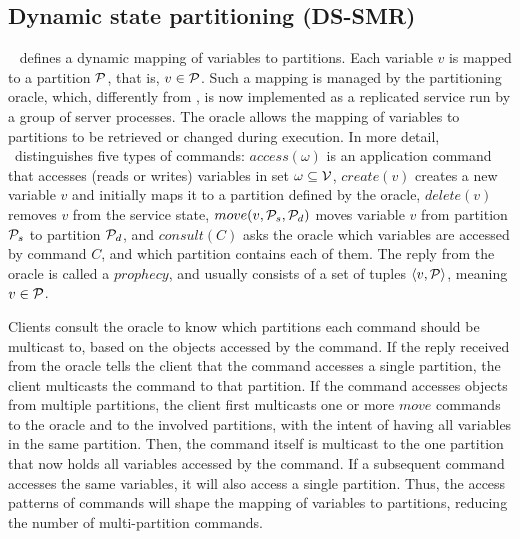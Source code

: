 \subsection{Dynamic state partitioning (DS-SMR)}

\dssmr{}~\cite{hoang2016} defines a dynamic mapping of variables to partitions.
Each variable $v$ is mapped to a partition $\mathcal{P}$, that is, $v \in \mathcal{P}$.
Such a mapping is managed by the partitioning oracle, which, differently from \ssmr, is now implemented as a replicated service run by a group of server processes.
The oracle allows the mapping of variables to partitions to be retrieved or changed during execution.
In more detail, \dssmr\ distinguishes five types of commands:
$access(\omega)$ is an application command that accesses (reads or writes) variables in set $\omega \subseteq \mathcal{V}$,
$create(v)$ creates a new variable $v$ and initially maps it to a partition defined by the oracle,
$delete(v)$ removes $v$ from the service state,
$move(v,\mathcal{P}_s,\mathcal{P}_d)$ moves variable $v$ from partition $\mathcal{P}_s$ to partition $\mathcal{P}_d$,
and $consult(C)$ asks the oracle which variables are accessed by command $C$, and which partition contains each of them.
The reply from the oracle is called a $prophecy$, and usually consists of a set of tuples $\langle v, \mathcal{P} \rangle$, meaning $v \in \mathcal{P}$.


Clients consult the oracle to know which partitions each command should be multicast to, based on the objects accessed by the command.
If the reply received from the oracle tells the client that the command accesses a single partition, the client multicasts the command to that partition.
If the command accesses objects from multiple partitions, the client first multicasts one or more $move$ commands to the oracle and to the involved partitions, with the intent of having all variables in the same partition.
Then, the command itself is multicast to the one partition that now holds all variables accessed by the command.
If a subsequent command accesses the same variables, it will also access a single partition.
Thus, the access patterns of commands will shape the mapping of variables to partitions, reducing the number of multi-partition commands.

